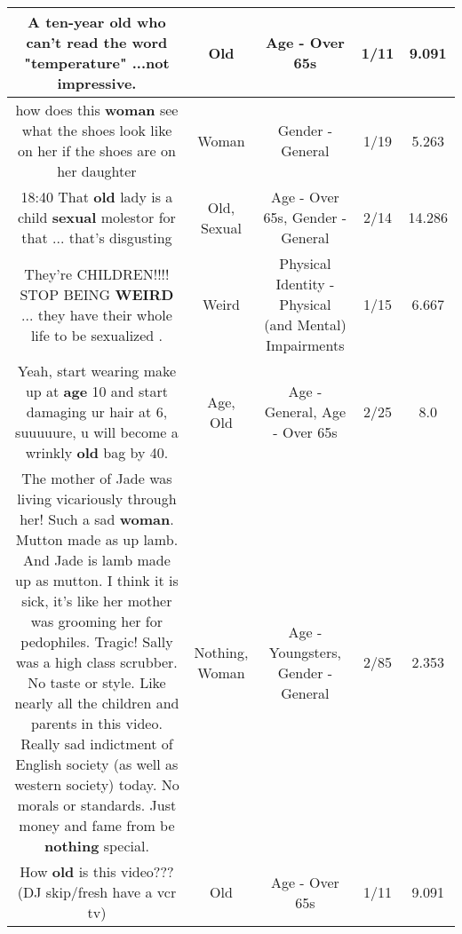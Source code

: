 \documentclass[11pt]{article}
\newlength\mylength
\begin{document}
\begin{center}
\begin{longtable}{|C{.65\mylength}|C{.30\mylength}|C{.12\mylength}|C{.12\mylength}|C{.12\mylength}|}
  \small A ten-year \textbf{old} who can't read the word "temperature" ...not impressive.\normalsize   & Old & Age - Over 65s & 1/11 & 9.091 \\  \hline
  \small how does this \textbf{woman} see what the shoes look like on her if the shoes are on her daughter\normalsize   & Woman & Gender - General & 1/19 & 5.263 \\  \hline
  \small 18:40 That \textbf{old} lady is a child \textbf{sexual} molestor for that ... that's disgusting\normalsize   & Old, Sexual & Age - Over 65s, Gender - General & 2/14 & 14.286 \\  \hline
  \small They're CHILDREN!!!! STOP BEING \textbf{WEIRD} ... they have their whole life to be sexualized .\normalsize   & Weird & Physical Identity - Physical (and Mental) Impairments & 1/15 & 6.667 \\  \hline
  \small Yeah, start wearing make up at \textbf{age} 10 and start damaging ur hair at 6, suuuuure, u will become a wrinkly \textbf{old} bag by 40.\normalsize   & Age, Old & Age - General, Age - Over 65s & 2/25 & 8.0 \\  \hline
  \small The mother of Jade was living vicariously through her! Such a sad \textbf{woman}. Mutton made as up lamb. And Jade is lamb made up as mutton. I think it is sick, it's like her mother was grooming her for pedophiles. Tragic! Sally was a high class scrubber. No taste or style. Like nearly all the children and parents in this video. Really sad indictment of English society (as well as western society) today.  No morals or standards. Just money and fame from be \textbf{nothing} special.\normalsize   & Nothing, Woman & Age - Youngsters, Gender - General & 2/85 & 2.353 \\  \hline
  \small How \textbf{old} is this video???  (DJ skip/fresh have a vcr tv)\normalsize   & Old & Age - Over 65s & 1/11 & 9.091 \\  \hline

\end{longtable}
\end{center}
\end{document}
